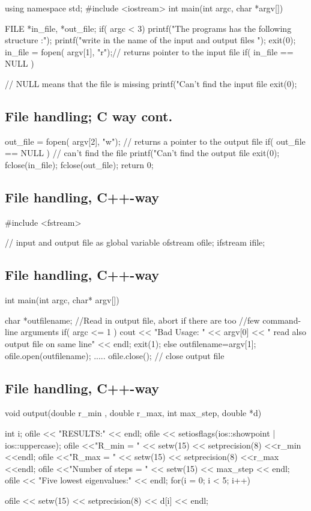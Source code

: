 \documentclass[%
twoside,                 %
final,                   %
10pt]{article}
\begin{document}
\bcppcod
using namespace std;
#include <iostream>
int main(int argc, char *argv[])
{
  FILE *in_file, *out_file;
  if( argc < 3)  {
    printf("The programs has the following structure :\n");
    printf("write in the name of the input and output files \n");
    exit(0);
  }
  in_file = fopen( argv[1], "r");// returns pointer to the  input file
  if( in_file == NULL )  { // NULL means that the file is missing
    printf("Can't find the input file %
    exit(0);
\ecppcod

\subsection{File handling; C way cont.}

\bcppcod
 out_file = fopen( argv[2], "w"); // returns a pointer to the output file
 if( out_file == NULL )  {       // can't find the file
    printf("Can't find the output file%
    exit(0);
  }
  fclose(in_file);
  fclose(out_file);
  return 0;
\ecppcod

\subsection{File handling, C++-way}

\bcppcod
#include <fstream>

// input and output file as global variable
ofstream ofile;
ifstream ifile;
\ecppcod

\subsection{File handling, C++-way}

\bcppcod
int main(int argc, char* argv[])
{
  char *outfilename;
  //Read in output file, abort if there are too
  //few command-line arguments
  if( argc <= 1 ){
    cout << "Bad Usage: " << argv[0] <<
      " read also output file on same line" << endl;
    exit(1);
  }
  else{
    outfilename=argv[1];
  }
  ofile.open(outfilename);
  .....
  ofile.close();  // close output file
\ecppcod

\subsection{File handling, C++-way}

\bcppcod
void output(double r_min , double r_max, int max_step,
            double *d)
{
int i;
ofile << "RESULTS:" << endl;
ofile << setiosflags(ios::showpoint | ios::uppercase);
ofile <<"R_min = " << setw(15) << setprecision(8) <<r_min <<endl;
ofile <<"R_max = " << setw(15) << setprecision(8) <<r_max <<endl;
ofile <<"Number of steps = " << setw(15) << max_step << endl;
ofile << "Five lowest eigenvalues:" << endl;
for(i = 0; i < 5; i++) {
    ofile << setw(15) << setprecision(8) << d[i] << endl;

}}}}}
\end{document}
